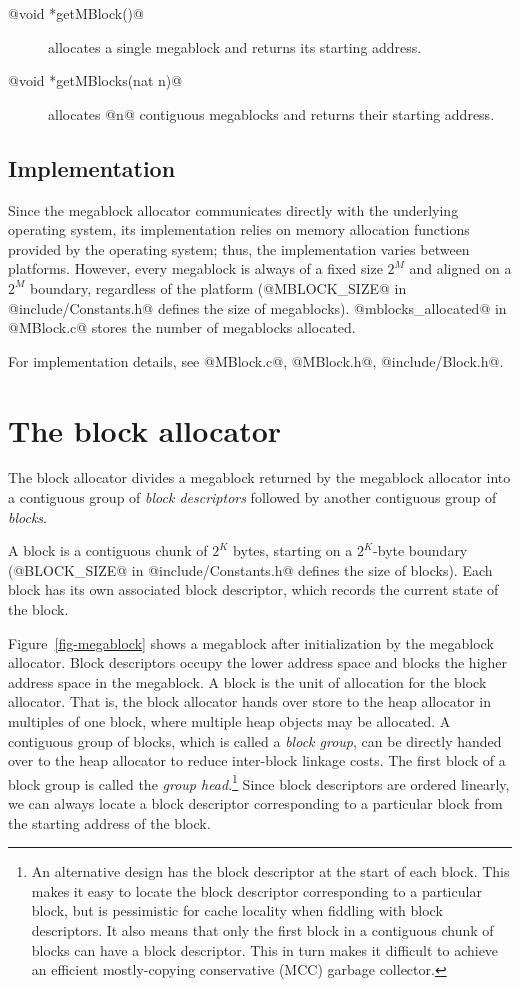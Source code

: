 \documentclass{article}
\begin{document}
\begin{description}
\item[@void *getMBlock()@] allocates a single megablock and returns its 
starting address. 
\item[@void *getMBlocks(nat n)@] allocates @n@ contiguous megablocks 
and returns their starting address. 
\end{description}

\subsection{Implementation}

Since the megablock allocator communicates directly with the underlying
operating system, its implementation relies on memory allocation functions
provided by the operating system; thus, the implementation varies between
platforms. 
However, every megablock is always of a fixed size $2^M$ and aligned on a 
$2^M$ boundary, regardless of the platform 
(@MBLOCK_SIZE@ in @include/Constants.h@ defines the size of megablocks).
@mblocks_allocated@ in @MBlock.c@ stores the number of megablocks allocated.

For implementation details, see @MBlock.c@, @MBlock.h@, @include/Block.h@. 

\section{The block allocator}

The block allocator divides a megablock returned by the megablock allocator
into a contiguous group of \emph{block descriptors} followed by another 
contiguous group of \emph{blocks}. 

A block is a contiguous chunk of $2^K$ bytes, starting on 
a $2^K$-byte boundary (@BLOCK_SIZE@ in 
@include/Constants.h@ defines the size of blocks). 
Each block has its own associated block descriptor, which records the
current state of the block. 

Figure~\ref{fig-megablock} shows a megablock after initialization by the 
megablock allocator. 
Block descriptors occupy the lower address space and blocks the higher address 
space in the megablock. 
A block is the unit of allocation for the block allocator. 
That is, the block allocator hands over store to the heap allocator in multiples of 
one block, where multiple heap objects may be allocated.
A contiguous group of blocks, which is called a \emph{block group}, can be 
directly handed over to the heap allocator to reduce inter-block 
linkage costs.
The first block of a block group is called the \emph{group head}.\footnote{
An alternative design has the block descriptor at the start of each block.
This makes it easy to locate the block descriptor corresponding to a particular
block, but is pessimistic for cache locality when fiddling with block descriptors.
It also means that only the first block in a contiguous chunk of blocks can
have a block descriptor. This in turn makes it difficult to achieve an
efficient mostly-copying conservative (MCC) garbage collector.}
Since block descriptors are ordered linearly, we can always locate a block 
descriptor corresponding to a particular block from the starting address 
of the block.
\end{document}
